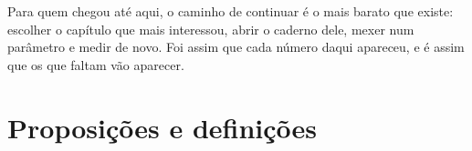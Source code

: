\documentclass[12pt]{book}
\theoremstyle{definition}
\theoremstyle{remark}
\begin{document}
Para quem chegou até aqui, o caminho de continuar é o mais barato que existe: escolher o capítulo
que mais interessou, abrir o caderno dele, mexer num parâmetro e medir de novo. Foi assim que
cada número daqui apareceu, e é assim que os que faltam vão aparecer.

{\singlespacing}


\cleardoublepage
{}
\listoffigures

\cleardoublepage
{}
\listoftables

\cleardoublepage
{}
\chapter*{Proposições e definições}

\end{document}
